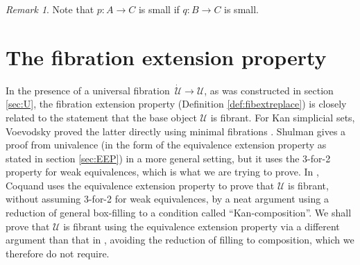 \documentclass[12pt]{article}
\newcommand{\ra}{\ensuremath{\rightarrow}}
\newcommand{\U}{\ensuremath{\mathcal{U}}}
\newcommand{\UU}{\ensuremath{\,\dot{\mathcal{U}}}}
\theoremstyle{remark}
\newtheorem{remark}[theorem]{Remark}
\theoremstyle{definition}
\begin{document}
\begin{remark}
Note that $p : A \ra C$ is small if $q : B\ra C$ is small.
\end{remark}

\section{The fibration extension property}\label{sec:FEP}

In the presence of a universal fibration $\UU\ra\U$, as was constructed in section \ref{sec:U}, the fibration extension property (Definition \ref{def:fibextreplace})  is closely related to the statement that the base object $\U$ is fibrant.  For Kan simplicial sets, Voevodsky proved the latter directly using minimal fibrations \cite{VVuniverse}.  Shulman \cite{Shulmanuniverse} gives a proof from univalence (in the form of the equivalence extension property as stated in section \ref{sec:EEP}) in a more general setting, but it uses the 3-for-2 property for weak equivalences, which is what we are trying to prove. In \cite{CCHM}, Coquand uses the equivalence extension property to prove that $\U$ is fibrant, without assuming 3-for-2 for weak equivalences, by a neat argument using a reduction of general box-filling to a condition called ``Kan-composition''.   We shall prove that $\U$ is fibrant using the equivalence extension property via a different argument than that in \cite{CCHM}, avoiding the reduction of filling to composition, which we therefore do not require.
\end{document}
